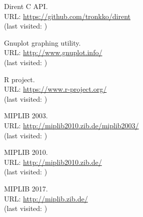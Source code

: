 \documentclass[a4paper,12pt]{book}
\begin{document}
\begin{thebibliography}{9}
	 Dirent C API. \\ URL: \url{https://github.com/tronkko/dirent} \\ (last visited: )

	 Gnuplot graphing utility. \\ URL: \url{http://www.gnuplot.info/} \\ (last visited: )

	 R project. \\ URL: \url{https://www.r-project.org/} \\ (last visited: )

	 MIPLIB 2003. \\ URL: \url{http://miplib2010.zib.de/miplib2003/} \\ (last visited: )

	 MIPLIB 2010. \\ URL: \url{http://miplib2010.zib.de/} \\ (last visited: )

	 MIPLIB 2017. \\ URL: \url{http://miplib.zib.de/} \\ (last visited: )
	
\end{thebibliography}
\end{document}
